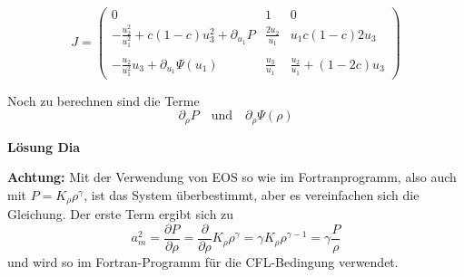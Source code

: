 \begin{equation}
J = \left(\begin{array}{ccc}
0 & 1 & 0\\
 - \frac{u_2^2}{u_1^2} + c (1-c) u_3^2 + \partial_{u_1} P & \frac{2 u_2}{u_1} &  
u_1 c (1-c) 2 u_3  \\
\\
 - \frac{u_2}{u_1^2} u_3 + \partial_{u_1} \Psi(u_1)  &   \frac{u_3}{u_1}  &  
\frac{u_2}{u_1} + (1-2c) u_3 
\end{array}\right)\label{eq:jacobi_general}
\end{equation}

Noch zu berechnen sind die Terme
\[
\partial_{\rho} P\quad\mbox{und}\quad \partial_{\rho} \Psi(\rho)
\]

{\bf Lösung Dia}

{\bf Achtung:} Mit der Verwendung von EOS so wie im Fortranprogramm,
also auch mit $P= K_\rho\rho^{\gamma}$, ist das System überbestimmt,
aber es vereinfachen sich die Gleichung. Der erste Term ergibt sich zu
\[
a_m^2 = \frac{\partial P}{\partial \rho} = \frac{\partial} {\partial \rho}
K_\rho\rho^{\gamma} = \gamma K_\rho\rho^{\gamma-1} = \gamma \frac{P}{\rho}
\]
und wird so im Fortran-Programm für die CFL-Bedingung verwendet.

